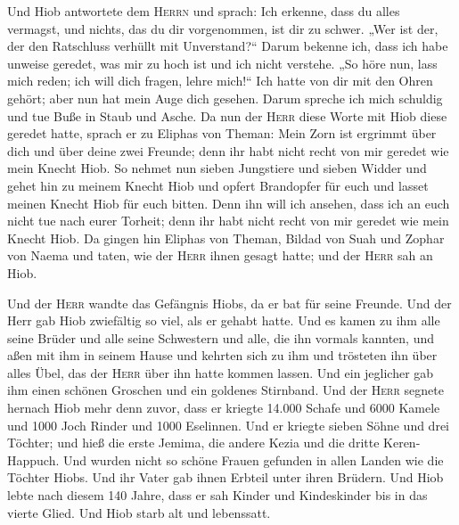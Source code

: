  Und Hiob antwortete dem \textsc{Herrn} und sprach:
 Ich erkenne, dass du alles vermagst, und nichts, das du
dir vorgenommen, ist dir zu schwer.  „Wer ist der, der den
Ratschluss verhüllt mit Unverstand?{}`` Darum bekenne ich, dass ich habe
unweise geredet, was mir zu hoch ist und ich nicht verstehe.
 „So höre nun, lass mich reden; ich will dich fragen,
lehre mich!{}``  Ich hatte von dir mit den Ohren gehört;
aber nun hat mein Auge dich gesehen.  Darum spreche ich
mich schuldig und tue Buße in Staub und Asche.  Da nun der
\textsc{Herr} diese Worte mit Hiob diese geredet hatte, sprach er zu
Eliphas von Theman: Mein Zorn ist ergrimmt über dich und über deine zwei
Freunde; denn ihr habt nicht recht von mir geredet wie mein Knecht Hiob.
 So nehmet nun sieben Jungstiere und sieben Widder und
gehet hin zu meinem Knecht Hiob und opfert Brandopfer für euch und
lasset meinen Knecht Hiob für euch bitten. Denn ihn will ich ansehen,
dass ich an euch nicht tue nach eurer Torheit; denn ihr habt nicht recht
von mir geredet wie mein Knecht Hiob.  Da gingen hin
Eliphas von Theman, Bildad von Suah und Zophar von Naema und taten, wie
der \textsc{Herr} ihnen gesagt hatte; und der \textsc{Herr} sah an Hiob.

 Und der \textsc{Herr} wandte das Gefängnis Hiobs, da er
bat für seine Freunde. Und der Herr gab Hiob zwiefältig so viel, als er
gehabt hatte.  Und es kamen zu ihm alle seine Brüder und
alle seine Schwestern und alle, die ihn vormals kannten, und aßen mit
ihm in seinem Hause und kehrten sich zu ihm und trösteten ihn über alles
Übel, das der \textsc{Herr} über ihn hatte kommen lassen. Und ein
jeglicher gab ihm einen schönen Groschen und ein goldenes Stirnband.
 Und der \textsc{Herr} segnete hernach Hiob mehr denn
zuvor, dass er kriegte 14.000 Schafe und 6000 Kamele und 1000 Joch
Rinder und 1000 Eselinnen.  Und er kriegte sieben Söhne
und drei Töchter;  und hieß die erste Jemima, die andere
Kezia und die dritte Keren-Happuch.  Und wurden nicht so
schöne Frauen gefunden in allen Landen wie die Töchter Hiobs. Und ihr
Vater gab ihnen Erbteil unter ihren Brüdern.  Und Hiob
lebte nach diesem 140 Jahre, dass er sah Kinder und Kindeskinder bis in
das vierte Glied.  Und Hiob starb alt und lebenssatt.
